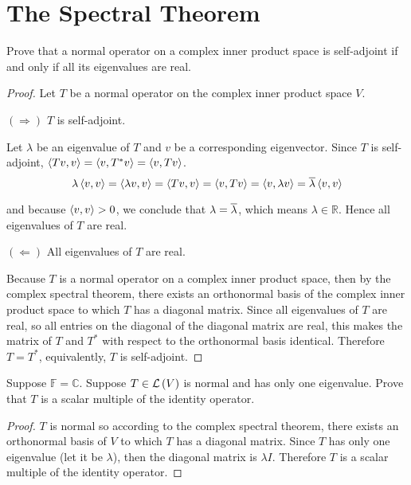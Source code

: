 \section{The Spectral Theorem}

\begin{exercise}
    Prove that a normal operator on a complex inner product space is self-adjoint if and only if all its eigenvalues are real.
\end{exercise}

\begin{proof}
    Let $T$ be a normal operator on the complex inner product space $V$.

    $(\Rightarrow)$ $T$ is self-adjoint.

    Let $\lambda$ be an eigenvalue of $T$ and $v$ be a corresponding eigenvector. Since $T$ is self-adjoint, $\left\langle{Tv, v}\right\rangle = \left\langle{v, T^{*}v}\right\rangle = \left\langle{v, Tv}\right\rangle$.
    \[
        \lambda\left\langle{v, v}\right\rangle = \left\langle{\lambda v, v}\right\rangle = \left\langle{Tv, v}\right\rangle = \left\langle{v, Tv}\right\rangle = \left\langle{v, \lambda v}\right\rangle = \overline{\lambda}\left\langle{v, v}\right\rangle
    \]

    and because $\left\langle{v,v}\right\rangle > 0$, we conclude that $\lambda = \overline{\lambda}$, which means $\lambda\in\mathbb{R}$. Hence all eigenvalues of $T$ are real.

    $(\Leftarrow)$ All eigenvalues of $T$ are real.

    Because $T$ is a normal operator on a complex inner product space, then by the complex spectral theorem, there exists an orthonormal basis of the complex inner product space to which $T$ has a diagonal matrix. Since all eigenvalues of $T$ are real, so all entries on the diagonal of the diagonal matrix are real, this makes the matrix of $T$ and $T^{*}$ with respect to the orthonormal basis identical. Therefore $T = T^{*}$, equivalently, $T$ is self-adjoint.
\end{proof}
\newpage

\begin{exercise}
    Suppose $\mathbb{F} = \mathbb{C}$. Suppose $T \in \mathcal{L}\left({V}\right)$ is normal and has only one eigenvalue. Prove that $T$ is a scalar multiple of the identity operator.
\end{exercise}

\begin{proof}
    $T$ is normal so according to the complex spectral theorem, there exists an orthonormal basis of $V$ to which $T$ has a diagonal matrix. Since $T$ has only one eigenvalue (let it be $\lambda$), then the diagonal matrix is $\lambda I$. Therefore $T$ is a scalar multiple of the identity operator.
\end{proof}
\newpage


